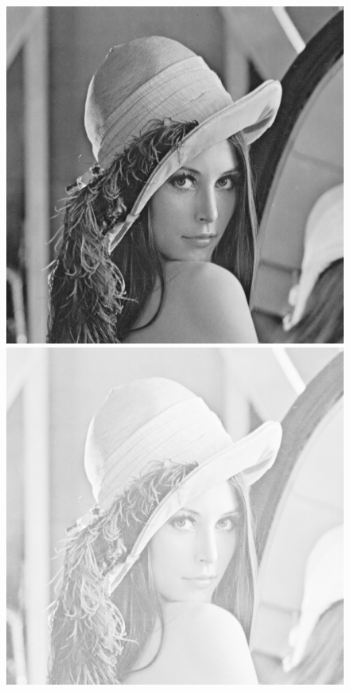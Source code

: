 \documentclass{article}
\begin{document}
\begin{figure}[!htb]
\centering
\includegraphics[scale=0.2]{img/lena_8bit.png}
\includegraphics[scale=0.2]{img/_Logarytmowanie_Obrazu_lena_8bit.png}\\

\end{figure}
\end{document}
